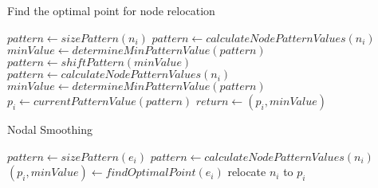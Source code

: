 \begin{algorithm}
\begin{algorithmic}
\caption{Find the optimal point for node relocation}
 
  \State $pattern \gets sizePattern\left( n_i \right)$
  \State $pattern \gets calculateNodePatternValues\left( n_i \right)$
  \State $minValue \gets determineMinPatternValue\left( pattern \right)$
    \State $pattern \gets shiftPattern\left( minValue \right)$
    \State $pattern \gets calculateNodePatternValues\left( n_i \right)$
    \State $minValue \gets determineMinPatternValue\left( pattern \right)$
  \EndWhile
  \State $p_i \gets currentPatternValue\left( pattern \right)$
  \State $return \gets \left( p_i, minValue \right)$
\EndProcedure
\end{algorithmic}
\end{algorithm}

\begin{algorithm}[H]
\caption{Nodal Smoothing}
\begin{algorithmic}
 
    \State $pattern \gets sizePattern\left( e_i \right)$
    \State $pattern \gets calculateNodePatternValues\left( n_i \right)$
    \State $\left( p_i, minValue \right) \gets findOptimalPoint\left( e_i \right)$
  \EndFor
    \State relocate $n_i$ to $p_i$
  \EndIf
\EndProcedure
\end{algorithmic}
\end{algorithm}
